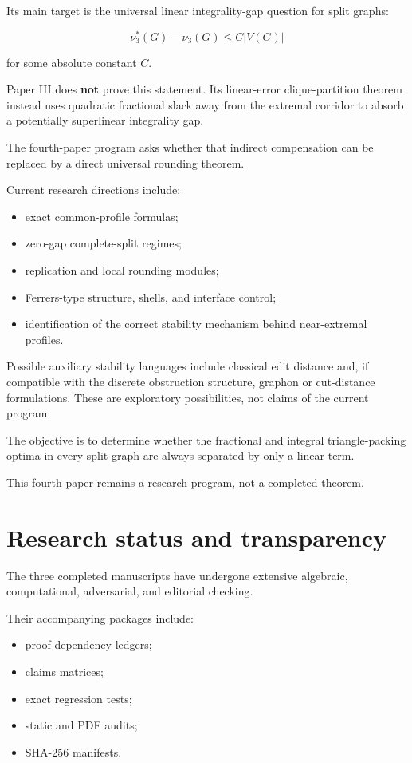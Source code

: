 \documentclass[11pt,a4paper]{article}
\begin{document}
Its main target is the universal linear integrality-gap question for split graphs:

\[
\boxed{
\nu_3^*(G)-\nu_3(G)
\le
C|V(G)|
}
\]

for some absolute constant \(C\).

Paper III does \textbf{not} prove this statement. Its linear-error clique-partition theorem instead uses quadratic fractional slack away from the extremal corridor to absorb a potentially superlinear integrality gap.

The fourth-paper program asks whether that indirect compensation can be replaced by a direct universal rounding theorem.

Current research directions include:

\begin{itemize}
\item exact common-profile formulas;
\item zero-gap complete-split regimes;
\item replication and local rounding modules;
\item Ferrers-type structure, shells, and interface control;
\item identification of the correct stability mechanism behind near-extremal profiles.
\end{itemize}

Possible auxiliary stability languages include classical edit distance and, if compatible with the discrete obstruction structure, graphon or cut-distance formulations. These are exploratory possibilities, not claims of the current program.

The objective is to determine whether the fractional and integral triangle-packing optima in every split graph are always separated by only a linear term.

This fourth paper remains a research program, not a completed theorem.

\section{Research status and transparency}

The three completed manuscripts have undergone extensive algebraic, computational, adversarial, and editorial checking.

Their accompanying packages include:

\begin{itemize}
\item proof-dependency ledgers;
\item claims matrices;
\item exact regression tests;
\item static and PDF audits;
\item SHA-256 manifests.
\end{itemize}
\end{document}
